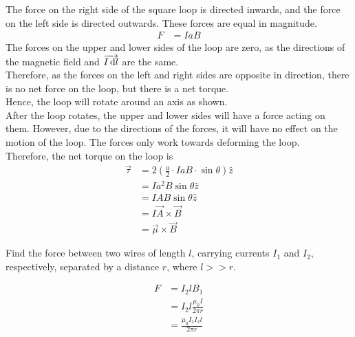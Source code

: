 \documentclass[fleqn, a4paper, 12pt, twoside]{article}
\theoremstyle{definition}
\theoremstyle{theorem}
\begin{document}
\begin{solution}
	The force on the right side of the square loop is directed inwards, and the force on the left side is directed outwards.
	These forces are equal in magnitude.
	\begin{align*}
		F & = I a B
	\end{align*}
	The forces on the upper and lower sides of the loop are zero, as the directions of the magnetic field and $\overrightarrow{I \dif l}$ are the same.\\
	Therefore, as the forces on the left and right sides are opposite in direction, there is no net force on the loop, but there is a net torque.\\
	Hence, the loop will rotate around an axis as shown.\\
	After the loop rotates, the upper and lower sides will have a force acting on them.
	However, due to the directions of the forces, it will have no effect on the motion of the loop.
	The forces only work towards deforming the loop.\\
	Therefore, the net torque on the loop is
	\begin{align*}
		\overrightarrow{\tau} & = 2 \left( \frac{a}{2} \cdot I a B \cdot \sin \theta \right) \hat{z} \\
                                      & = I a^2 B \sin \theta \hat{z}                                        \\
                                      & = I A B \sin \theta \hat{z}                                          \\
                                      & = I \overrightarrow{A} \times \overrightarrow{B}                     \\
                                      & = \overrightarrow{\mu} \times \overrightarrow{B}
	\end{align*}
\end{solution}

\begin{question}
	Find the force between two wires of length $l$, carrying currents $I_1$ and $I_2$, respectively, separated by a distance $r$, where $l >> r$.
\end{question}

\begin{solution}
	\begin{align*}
		F & = I_2 l B_1                     \\
                  & = I_2 l \frac{\mu_0 I}{2 \pi r} \\
                  & = \frac{\mu_0 I_1 I_2 l}{2 \pi r}
	\end{align*}
\end{solution}
\end{document}
